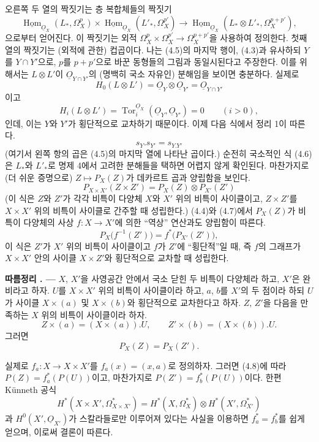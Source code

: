 \documentclass[11pt,twoside,openany]{book}
\numberwithin{equation}{section}
\newcommand{\sourceunit}{front}
\newcommand{\src}[1]{%
  \phantomsection\hypertarget{src:\sourceunit:#1}{}%
  \marginpar{\raggedleft\footnotesize\sffamily #1}%
}
\newcommand{\Osh}{\underline{O}}
\newcommand{\Homsh}{\underline{\operatorname{Hom}}}
\theoremstyle{plain}
\theoremstyle{definition}
\theoremstyle{remark}
\newcommand{\result}[2]{%
  \par\medskip\noindent\textbf{#1%
  \if\relax\detokenize{#2}\relax\else\space#2\fi. ---}\enspace
}
\begin{document}
\src{180}
오른쪽 두 열의 짝짓기는 층 복합체들의 짝짓기
\[
\Homsh_{\Osh_X}(L_{*},\Omega_X^{p})
\times\Homsh_{\Osh_X}(L'_{*},\Omega_X^{p'})
\longrightarrow
\Homsh_{\Osh_X}(L_{*}\otimes L'_{*},\Omega_X^{p+p'}),
\]
으로부터 얻어진다. 이 짝짓기는 외적
$\Omega_X^{p}\times\Omega_X^{p'}\longrightarrow\Omega_X^{p+p'}$을 사용하여
정의한다. 첫째 열의 짝짓기는 (외적에 관한) 컵곱이다. 나는 (4.5)의
마지막 행이, (4.3)과 유사하되 $Y$를 $Y\cap Y'$으로, $p$를 $p+p'$으로
바꾼 동형들의 그림과 동일시된다고 주장한다. 이를 위해서는
$L\otimes L'$이 $\Osh_{Y\cap Y'}$의 (명백히 국소 자유인) 분해임을
보이면 충분하다. 실제로
\[
  H_0(L\otimes L')=\Osh_Y\otimes\Osh_{Y'}=\Osh_{Y\cap Y'}
\]
이고
\[
  H_i(L\otimes L')=\operatorname{Tor}_{i}^{\Osh_X}(\Osh_Y,\Osh_{Y'})=0
  \qquad(i>0),
\]
인데, 이는 $Y$와 $Y'$가 횡단적으로 교차하기 때문이다. 이제 다음 식에서
정리 1이 따른다.
\begin{equation}\tag{4.6}
  s_Y.s_{Y'}=s_{Y.Y'}
\end{equation}
(여기서 왼쪽 항의 곱은 (4.5)의 마지막 열에 나타난 곱이다.) 순전히
국소적인 식 (4.6)은 $L_{*}$와 $L'_{*}$로 명제 4에서 고려한 분해들을
택하면 어렵지 않게 확인된다. 마찬가지로 (더 쉬운 증명으로)
$Z\longmapsto P_X(Z)$가 데카르트 곱과 양립함을 보인다.
\begin{equation}\tag{4.7}
  P_{X\times X'}(Z\times Z')=P_X(Z)\otimes P_{X'}(Z')
\end{equation}
(이 식은 $Z$와 $Z'$가 각각 비특이 다양체 $X$와 $X'$ 위의 비특이
사이클이고, $Z\times Z'$를 $X\times X'$ 위의 비특이 사이클로 간주할 때
성립한다.) (4.4)와 (4.7)에서 $P_X(Z)$가 비특이 다양체의 사상
$f:X\longrightarrow X'$에 의한 ``역상'' 연산과도 양립함이 따른다.
\begin{equation}\tag{4.8}
  P_X\bigl(f^{-1}(Z')\bigr)=f^{*}\bigl(P_{X'}(Z')\bigr),
\end{equation}
이 식은 $Z'$가 $X'$ 위의 비특이 사이클이고 $f$가 $Z'$에 ``횡단적''일 때,
즉 $f$의 그래프가 $X\times X'$ 안의 사이클 $X\times Z'$와 횡단적으로
교차할 때 성립한다.

\src{181}
\result{따름정리}{1} $X$, $X'$을 사영공간 안에서 국소 닫힌 두 비특이
다양체라 하고, $X'$은 완비라고 하자. $U$를 $X\times X'$ 위의 비특이
사이클이라 하고, $a$, $b$를 $X'$의 두 점이라 하되 $U$가 사이클
$X\times(a)$ 및 $X\times(b)$와 횡단적으로 교차한다고 하자. $Z$, $Z'$을
다음을 만족하는 $X$ 위의 비특이 사이클이라 하자.
\[
  Z\times(a)=(X\times(a)).U,
  \qquad
  Z'\times(b)=(X\times(b)).U.
\]
그러면
\[
  P_X(Z)=P_X(Z').
\]

실제로 $f_a:X\longrightarrow X\times X'$를 $f_a(x)=(x,a)$로 정의하자.
그러면 (4.8)에 따라 $P(Z)=f_a^{*}(P(U))$이고, 마찬가지로
$P(Z')=f_b^{*}(P(U))$이다. 한편 K\"unneth 공식
\[
  H^{*}(X\times X',\Omega_{X\times X'}^{*})
  =H^{*}(X,\Omega_X^{*})\otimes H^{*}(X',\Omega_{X'}^{*})
\]
과 $H^{0}(X',\Osh_{X'})$가 스칼라들로만 이루어져 있다는 사실을
이용하면 $f_a^{*}=f_b^{*}$를 쉽게 얻으며, 이로써 결론이 따른다.
\end{document}
